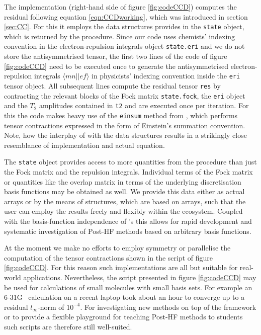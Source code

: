 The \python implementation (right-hand side
of figure \ref{fig:codeCCD})
computes the \CCD residual following equation \eqref{eqn:CCDworking},
which was introduced in section \ref{sec:CC}.
For this it employs the data structures \molsturm provides
in the \texttt{state} object, which is returned by the \SCF procedure.
Since our code uses chemists' indexing convention
in the electron-repulsion integrals object \texttt{state.eri}
and we do not store the antisymmetrised tensor,
the first two lines of the code of figure \ref{fig:codeCCD}
need to be executed once to generate
the antisymmetrised electron-repulsion integrals $\langle mn||ef \rangle$
in physicists' indexing convention
inside the \texttt{eri} tensor object.
All subsequent lines compute the residual tensor \texttt{res}
by contracting the relevant blocks of the Fock matrix \texttt{state.fock},
the \texttt{eri} object and the $T_2$ amplitudes contained in \texttt{t2}
and are executed once per \CCD iteration.
For this the code makes heavy use of the \texttt{einsum} method from \numpy,
which performs tensor contractions
expressed in the form of Einstein's summation convention.
Note, how the interplay of \numpy
with the data structures \molsturm results in a
strikingly close resemblance of implementation and actual equation.

The \texttt{state} object
provides access to more quantities from the \SCF procedure
than just the Fock matrix and the repulsion integrals.
Individual terms of the Fock matrix or
quantities like the overlap matrix in terms of the underlying
discretisation basis functions may be obtained as well.
We provide this data either as actual \numpy arrays
or by the means of structures,
which are based on \numpy arrays,
such that the user can employ the \SCF results freely and flexibly
within the \python ecosystem.
Coupled with the basis-function independence of \molsturm's
\SCF this allows for rapid development and systematic investigation
of Post-HF methods based on arbitrary basis functions.

At the moment we make no efforts to employ symmetry or parallelise
the computation of the tensor contractions
shown in the script of figure \ref{fig:codeCCD}.
For this reason such implementations are all but suitable for
real-world applications.
Nevertheless, the script presented in figure \ref{fig:codeCCD}
may be used for \CCD calculations of small molecules with small basis sets.
For example an  6-31G~\cite{Hehre1972} calculation on a recent laptop took
about an hour to converge up to a residual $l_\infty$-norm of $10^{-4}$.
For investigating new methods on top of the \molsturm framework
or to provide a flexible playground for teaching Post-HF methods to students
such scripts are therefore still well-suited.

